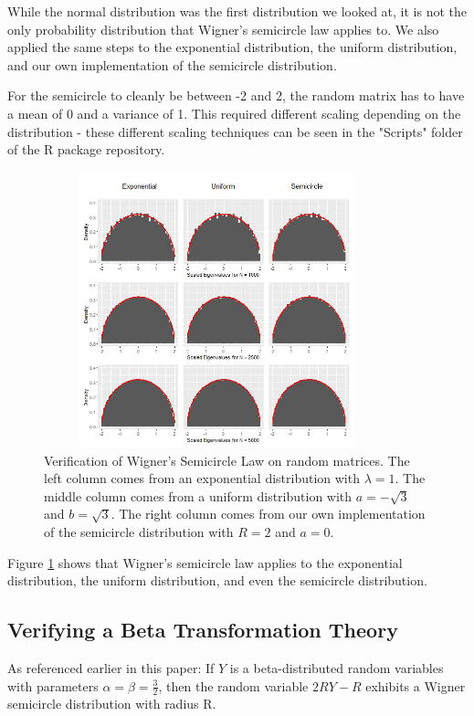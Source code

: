 \documentclass[11pt]{asaproc}
\begin{document}
While the normal distribution was the first distribution we looked at, it is not the only probability distribution that Wigner's semicircle law applies to. We also applied the same steps to the exponential distribution, the uniform distribution, and our own implementation of the semicircle distribution.

For the semicircle to cleanly be between -2 and 2, the random matrix has to have a mean of 0 and a variance of 1. This required different scaling depending on the distribution - these different scaling techniques can be seen in the "Scripts" folder of the R package repository.

\begin{figure}[H]
    \centering
    \includegraphics[width=10cm,height=8cm]{figures/SemiLaw_Combined.jpeg}
    \caption{Verification of Wigner's Semicircle Law on random matrices. The left column comes from an exponential distribution with $\lambda=1$. The middle column comes from a uniform distribution with $a=-\sqrt{3}$ and $b=\sqrt{3}$. The right column comes from our own implementation of the semicircle distribution with $R=2$ and $a=0$.}
    \label{fig:semilaw_combined}
\end{figure}

Figure \ref{fig:semilaw_combined} shows that Wigner's semicircle law applies to the exponential distribution, the uniform distribution, and even the semicircle distribution.

\subsection{Verifying a Beta Transformation Theory}

As referenced earlier in this paper: If $Y$ is a beta-distributed random variables with parameters $\alpha = \beta = \frac{3}{2}$, then the random variable $2RY-R$ exhibits a Wigner semicircle distribution with radius R.
\end{document}
